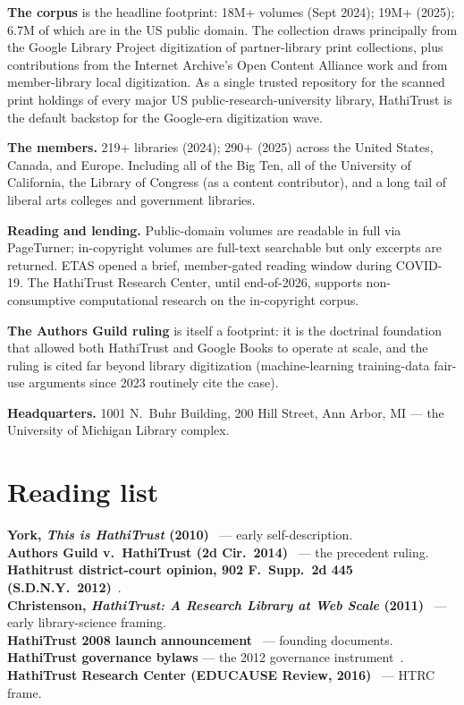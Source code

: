 \documentclass[10pt,letterpaper,twocolumn]{article}
\begin{document}
\textbf{The corpus} is the headline footprint: 18M+ volumes (Sept 2024); 19M+ (2025); 6.7M of which are in the US public domain. The collection draws principally from the Google Library Project digitization of partner-library print collections, plus contributions from the Internet Archive's Open Content Alliance work and from member-library local digitization. As a single trusted repository for the scanned print holdings of every major US public-research-university library, HathiTrust is the default backstop for the Google-era digitization wave.

\textbf{The members.} 219+ libraries (2024); 290+ (2025) across the United States, Canada, and Europe. Including all of the Big Ten, all of the University of California, the Library of Congress (as a content contributor), and a long tail of liberal arts colleges and government libraries.

\textbf{Reading and lending.} Public-domain volumes are readable in full via PageTurner; in-copyright volumes are full-text searchable but only excerpts are returned. ETAS opened a brief, member-gated reading window during COVID-19. The HathiTrust Research Center, until end-of-2026, supports non-consumptive computational research on the in-copyright corpus.

\textbf{The Authors Guild ruling} is itself a footprint: it is the doctrinal foundation that allowed both HathiTrust and Google Books to operate at scale, and the ruling is cited far beyond library digitization (machine-learning training-data fair-use arguments since 2023 routinely cite the case).

\textbf{Headquarters.} 1001 N.~Buhr Building, 200 Hill Street, Ann Arbor, MI --- the University of Michigan Library complex.

\section{Reading list}

\textbf{York, \emph{This is HathiTrust} (2010)}~\citep{york2010thisis} --- early self-description.\\
\textbf{Authors Guild v.~HathiTrust (2d Cir.~2014)}~\citep{hathirulingappeal} --- the precedent ruling.\\
\textbf{Hathitrust district-court opinion, 902 F.~Supp.~2d 445 (S.D.N.Y.~2012)}~\citep{hathirulingdistrict}.\\
\textbf{Christenson, \emph{HathiTrust: A Research Library at Web Scale} (2011)}~\citep{christenson2011} --- early library-science framing.\\
\textbf{HathiTrust 2008 launch announcement}~\citep{cdl2008launch,um2008launch} --- founding documents.\\
\textbf{HathiTrust governance bylaws} --- the 2012 governance instrument~\citep{hathigovern}.\\
\textbf{HathiTrust Research Center (EDUCAUSE Review, 2016)}~\citep{plale2016educause} --- HTRC frame.
\end{document}
